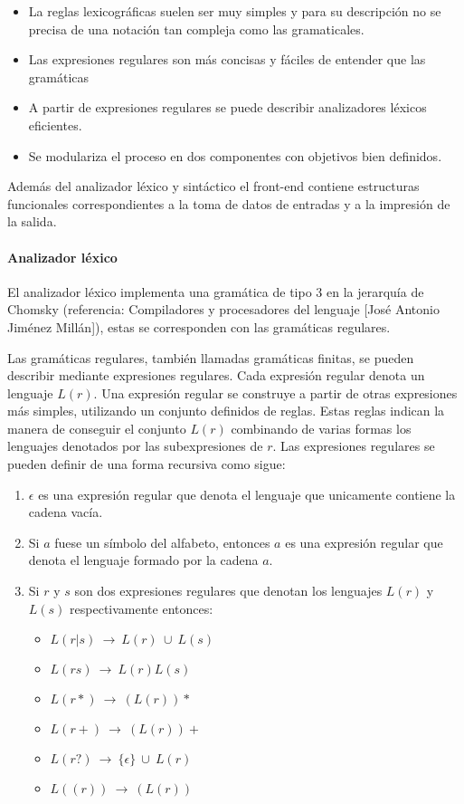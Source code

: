 \begin{itemize}
\item La reglas lexicográficas suelen ser muy simples y para su descripción no se precisa de una 
notación tan compleja como las gramaticales.
\item Las expresiones regulares son más concisas y fáciles de entender que las gramáticas
\item A partir de expresiones regulares se puede describir analizadores léxicos eficientes.
\item Se modulariza el proceso en dos componentes con objetivos bien definidos. 
\end{itemize}

Además del analizador léxico y sintáctico el front-end contiene estructuras funcionales correspondientes
a la toma de datos de entradas y a la impresión de la salida. 

\paragraph {Analizador léxico}
El analizador léxico implementa una gramática de tipo 3 en la jerarquía de Chomsky (referencia: Compiladores y procesadores del lenguaje [José Antonio Jiménez Millán]), estas
se corresponden con las gramáticas regulares. 

Las gramáticas regulares, también llamadas gramáticas finitas, se pueden describir mediante expresiones regulares. 
Cada expresión regular denota un lenguaje $L(r)$. Una expresión regular se construye a partir de otras expresiones
más simples, utilizando un conjunto definidos de reglas. Estas reglas indican la manera de conseguir el conjunto 
$L(r)$ combinando de varias formas los lenguajes denotados por las subexpresiones de $r$. Las expresiones regulares
se pueden definir de una forma recursiva como sigue: 

\begin {enumerate}
\item $\epsilon$ es una expresión regular que denota el lenguaje que unicamente contiene la cadena vacía.
\item Si $a$ fuese un símbolo del alfabeto, entonces $a$ es una expresión regular que denota el lenguaje formado
por la cadena $a$.
\item Si $r$ y $s$ son dos expresiones regulares que denotan los lenguajes $L(r)$ y $L(s)$ respectivamente entonces:
\begin{itemize}
   \item $L(r|s)\ \rightarrow\ L(r)\ \cup\ L(s)$
   \item $L(rs) \ \rightarrow\ L(r)L(s)$
   \item $L(r*)\ \rightarrow\ (L(r))*$
   \item $L(r+)\ \rightarrow\ (L(r))+$
   \item $L(r?)\ \rightarrow\ \{\epsilon\}\ \cup\ L(r)$
   \item $L((r))\ \rightarrow\ (L(r))$
\end{itemize}
\end{enumerate}

